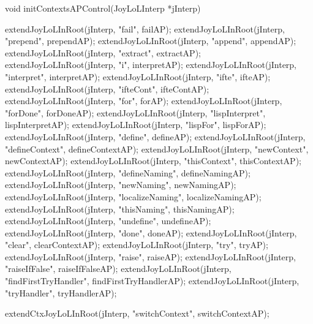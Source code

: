 \startCCode
void initContextsAPControl(JoyLoLInterp *jInterp) {
  extendJoyLoLInRoot(jInterp, "fail",                failAP);
  extendJoyLoLInRoot(jInterp, "prepend",             prependAP);
  extendJoyLoLInRoot(jInterp, "append",              appendAP);
  extendJoyLoLInRoot(jInterp, "extract",             extractAP);
  extendJoyLoLInRoot(jInterp, "i",                   interpretAP);
  extendJoyLoLInRoot(jInterp, "interpret",           interpretAP);
  extendJoyLoLInRoot(jInterp, "ifte",                ifteAP);
  extendJoyLoLInRoot(jInterp, "ifteCont",            ifteContAP);
  extendJoyLoLInRoot(jInterp, "for",                 forAP);
  extendJoyLoLInRoot(jInterp, "forDone",             forDoneAP);
  extendJoyLoLInRoot(jInterp, "lispInterpret",       lispInterpretAP);
  extendJoyLoLInRoot(jInterp, "lispFor",             lispForAP);
  extendJoyLoLInRoot(jInterp, "define",              defineAP);
  extendJoyLoLInRoot(jInterp, "defineContext",       defineContextAP);
  extendJoyLoLInRoot(jInterp, "newContext",          newContextAP);
  extendJoyLoLInRoot(jInterp, "thisContext",         thisContextAP);
  extendJoyLoLInRoot(jInterp, "defineNaming",        defineNamingAP);
  extendJoyLoLInRoot(jInterp, "newNaming",           newNamingAP);
  extendJoyLoLInRoot(jInterp, "localizeNaming",      localizeNamingAP);
  extendJoyLoLInRoot(jInterp, "thisNaming",          thisNamingAP);
  extendJoyLoLInRoot(jInterp, "undefine",            undefineAP);
  extendJoyLoLInRoot(jInterp, "done",                doneAP);
  extendJoyLoLInRoot(jInterp, "clear",               clearContextAP);
  extendJoyLoLInRoot(jInterp, "try",                 tryAP);
  extendJoyLoLInRoot(jInterp, "raise",               raiseAP);
  extendJoyLoLInRoot(jInterp, "raiseIfFalse",        raiseIfFalseAP);
  extendJoyLoLInRoot(jInterp, "findFirstTryHandler", findFirstTryHandlerAP);
  extendJoyLoLInRoot(jInterp, "tryHandler",          tryHandlerAP);
  
  extendCtxJoyLoLInRoot(jInterp, "switchContext",    switchContextAP);
}
\stopCCode